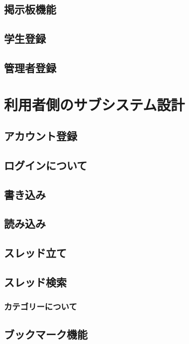 \documentclass[a4j]{jarticle}
\begin{document}
\subsection{掲示板機能}
\subsection{学生登録}
\subsection{管理者登録}



\section{利用者側のサブシステム設計}

\subsection{アカウント登録}

\subsection{ログインについて}


\subsection{書き込み}

\subsection{読み込み}

\subsection{スレッド立て}


\subsection{スレッド検索}

\subsubsection{カテゴリーについて}


\subsection{ブックマーク機能}
\end{document}
